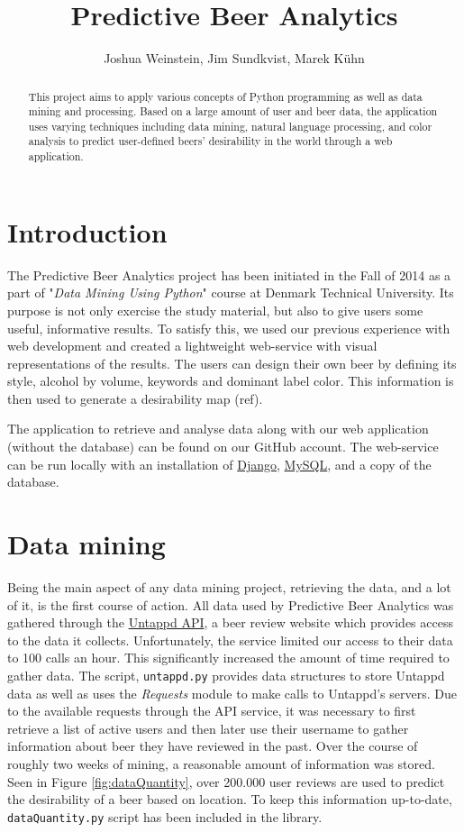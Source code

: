 \documentclass[10pt]{IEEEtran}
\title{Predictive Beer Analytics}
\author{Joshua Weinstein, Jim Sundkvist, Marek Kühn}
\begin{document}
\maketitle

\begin{abstract}
This project aims to apply various concepts of Python programming as well as data mining and processing.
Based on a large amount of user and beer data, the application uses varying techniques including data mining, natural language processing, and color analysis to predict user-defined beers' desirability in the world through a web application. 
\end{abstract}

\section{Introduction}

The Predictive Beer Analytics project has been initiated in the Fall of 2014 as a part of "\textit{Data Mining Using Python}" course at Denmark Technical University. Its purpose is not only exercise the study material, but also to give users some useful, informative results. To satisfy this, we used our previous experience with web development and created a lightweight web-service with visual representations of the results. The users can design their own beer by defining its style, alcohol by volume, keywords and dominant label color. This information is then used to generate a desirability map (ref).

The application to retrieve and analyse data along with our web application (without the database) can be found on our GitHub account. The web-service can be run locally with an installation of \href{https://www.djangoproject.com/}{Django}, \href{http://www.mysql.com/}{MySQL}, and a copy of the database.

\section{Data mining}
Being the main aspect of any data mining project, retrieving the data, and a lot of it, is the first course of action. All data used by Predictive Beer Analytics was gathered through the \href{https://untappd.com/api/docs}{Untappd API}, a beer review website which provides access to the data it collects. Unfortunately, the service limited our access to their data to 100 calls an hour. This significantly increased the amount of time required to gather data. The script, \texttt{untappd.py} provides data structures to store Untappd data as well as uses the \textit{Requests} module to make calls to Untappd's servers. Due to the available requests through the API service, it was necessary to first retrieve a list of active users and then later use their username to gather information about beer they have reviewed in the past. Over the course of roughly two weeks of mining, a reasonable amount of information was stored. Seen in Figure \ref{fig:dataQuantity}, over 200.000 user reviews are used to predict the desirability of a beer based on location. To keep this information up-to-date, \texttt{dataQuantity.py} script has been included in the library. 
\end{document}

